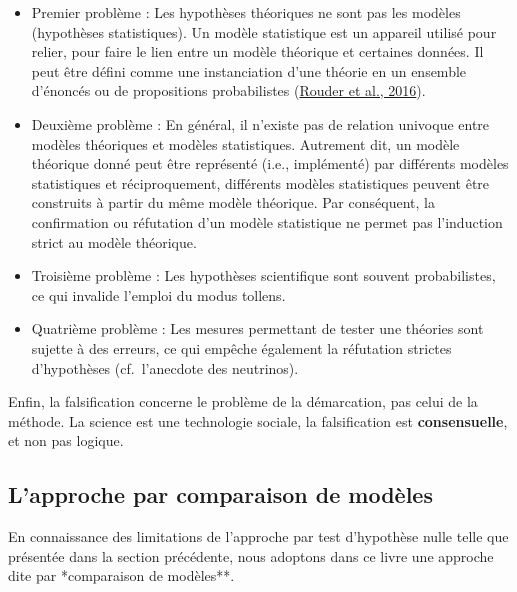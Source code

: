 \documentclass[
  a4paper,11pt,twoside,onecolumn,openright,final,oldfontcommands]{memoir}
\theoremstyle{definition}
\theoremstyle{definition}
\theoremstyle{definition}
\theoremstyle{definition}
\theoremstyle{remark}
\begin{document}
\begin{itemize}
\item
  Premier problème : Les hypothèses théoriques ne sont pas les modèles (hypothèses statistiques). Un modèle statistique est un appareil utilisé pour relier, pour faire le lien entre un modèle théorique et certaines données. Il peut être défini comme une instanciation d'une théorie en un ensemble d'énoncés ou de propositions probabilistes (\protect\hyperlink{ref-rouder_interplay_2016}{Rouder et al., 2016}).
\item
  Deuxième problème : En général, il n'existe pas de relation univoque entre modèles théoriques et modèles statistiques. Autrement dit, un modèle théorique donné peut être représenté (i.e., implémenté) par différents modèles statistiques et réciproquement, différents modèles statistiques peuvent être construits à partir du même modèle théorique. Par conséquent, la confirmation ou réfutation d'un modèle statistique ne permet pas l'induction strict au modèle théorique.
\item
  Troisième problème : Les hypothèses scientifique sont souvent probabilistes, ce qui invalide l'emploi du modus tollens.
\item
  Quatrième problème : Les mesures permettant de tester une théories sont sujette à des erreurs, ce qui empêche également la réfutation strictes d'hypothèses (cf.~l'anecdote des neutrinos).
\end{itemize}

Enfin, la falsification concerne le problème de la démarcation, pas celui de la méthode. La science est une technologie sociale, la falsification est \textbf{consensuelle}, et non pas logique.

\hypertarget{lapproche-par-comparaison-de-moduxe8les}{%
\subsection{L'approche par comparaison de modèles}\label{lapproche-par-comparaison-de-moduxe8les}}

En connaissance des limitations de l'approche par test d'hypothèse nulle telle que présentée dans la section précédente, nous adoptons dans ce livre une approche dite par *comparaison de modèles**.
\end{document}

